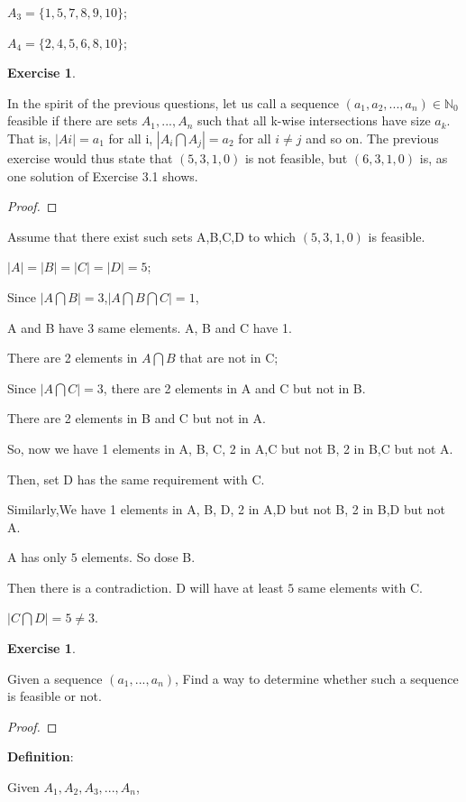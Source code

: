 \documentclass[12pt,a4]{article}
\theoremstyle{exercise}
\newtheorem{exercise}[theorem]{Exercise}
\begin{document}
    $A_3=\{1,5,7,8,9,10\}$;
    
    $A_4=\{2,4,5,6,8,10\}$;
    
\begin{exercise}
\end{exercise}
	In the spirit of the previous questions, let us call a sequence $(a_1,a_2,...,a_n)\in\mathbb{N}_0$ feasible if there are sets $A_1,...,A_n$ such that all k-wise intersections have size $a_k$. That is, $|Ai| = a_{1}$ for all i, $|A_i \bigcap A_j| = a_2$ for all $i \not= j$ and so on. The previous exercise would thus state that $(5, 3, 1, 0)$ is not feasible, but $(6, 3, 1, 0)$ is, as one solution of Exercise 3.1 shows.

\begin{proof}
\end{proof}

Assume that there exist such sets A,B,C,D to which $(5,3,1,0)$ is feasible.

$|A|=|B|=|C|=|D|=5$;

Since $|A\bigcap B|=3$,$|A\bigcap B\bigcap C|=1$,

A and B have 3 same elements. A, B and C have 1.

There are 2 elements in $A\bigcap B$ that are not in C;

Since $|A\bigcap C|=3$, there are 2 elements in A and C but not in B.

There are 2 elements in B and C but not in A.

So, now we have 1 elements in A, B, C, 2 in A,C but not B, 2 in B,C but not A.

Then, set D has the same requirement with C.

Similarly,We have 1 elements in A, B, D, 2 in A,D but not B, 2 in B,D but not A.

A has only $5$ elements. So dose B.

Then there is a contradiction. D will have at least $5$ same elements with C.

$|C\bigcap D|=5\not = 3$.

\begin{exercise}
\end{exercise}
	Given a sequence $(a_1,...,a_n)$, Find a way to determine whether such a sequence is feasible or not.

\begin{proof}
\end{proof}

 \textbf{Definition}: 
 
     Given $A_1,A_2,A_3,...,A_n$, 
     
\end{document}
